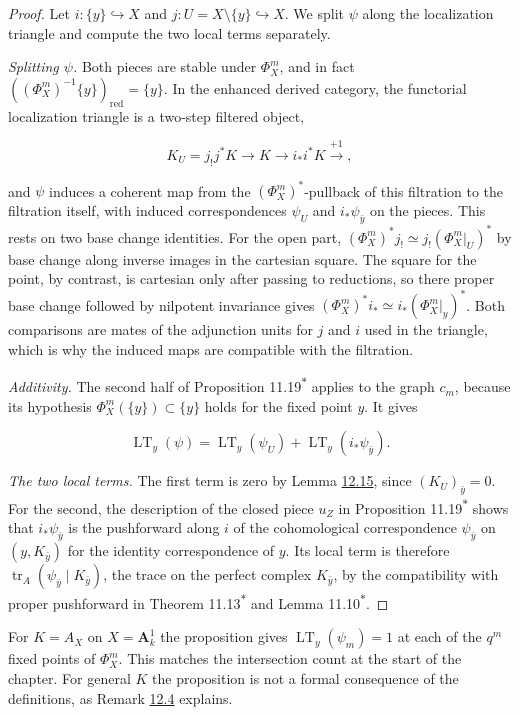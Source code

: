 \documentclass[11pt]{article}
\newcommand{\bpout}[1]{#1\textsuperscript{\hyperlink{bp-outside}{\ensuremath{\ast}}}}
\begin{document}
\begin{proof}[{Proof}]\label{bp50}%
Let \(i:\{y\}\hookrightarrow X\) and \(j:U=X\setminus\{y\}\hookrightarrow X\). We split \(\psi\) along the localization triangle and compute the two local terms separately.

\emph{Splitting \(\psi\).} Both pieces are stable under \(\Phi_X^m\), and in fact \(((\Phi_X^m)^{-1}\{y\})_{\mathrm{red}}=\{y\}\). In the enhanced derived category, the functorial localization triangle is a two-step filtered object,

\[
K_U=j_!j^*K\longrightarrow K\longrightarrow i_*i^*K
\xrightarrow{+1},
\]

and \(\psi\) induces a coherent map from the \((\Phi_X^m)^*\)-pullback of this filtration to the filtration itself, with induced correspondences \(\psi_U\) and \(i_*\psi_{\bar y}\) on the pieces. This rests on two base change identities. For the open part, \((\Phi_X^m)^*j_!\simeq j_!(\Phi_X^m|_U)^*\) by base change along inverse images in the cartesian square. The square for the point, by contrast, is cartesian only after passing to reductions, so there proper base change followed by nilpotent invariance gives \((\Phi_X^m)^*i_*\simeq i_*(\Phi_X^m|_y)^*\). Both comparisons are mates of the adjunction units for \(j\) and \(i\) used in the triangle, which is why the induced maps are compatible with the filtration.

\emph{Additivity.} The second half of Proposition \bpout{11.19} applies to the graph \(c_m\), because its hypothesis \(\Phi_X^m(\{y\})\subset\{y\}\) holds for the fixed point \(y\). It gives

\[
\operatorname{LT}_y(\psi)
=\operatorname{LT}_y(\psi_U)
+\operatorname{LT}_y(i_*\psi_{\bar y}).
\]

\emph{The two local terms.} The first term is zero by Lemma \hyperref[bp45]{12.15}, since \((K_U)_{\bar y}=0\). For the second, the description of the closed piece \(u_Z\) in Proposition \bpout{11.19} shows that \(i_*\psi_{\bar y}\) is the pushforward along \(i\) of the cohomological correspondence \(\psi_{\bar y}\) on \((y,K_{\bar y})\) for the identity correspondence of \(y\). Its local term is therefore \(\operatorname{tr}_A(\psi_{\bar y}\mid K_{\bar y})\), the trace on the perfect complex \(K_{\bar y}\), by the compatibility with proper pushforward in Theorem \bpout{11.13} and Lemma \bpout{11.10}.
\end{proof}

\label{bp51}%
For \(K=A_X\) on \(X=\mathbf A^1_k\) the proposition gives \(\operatorname{LT}_y(\psi_m)=1\) at each of the \(q^m\) fixed points of \(\Phi^m_X\). This matches the intersection count at the start of the chapter. For general \(K\) the proposition is not a formal consequence of the definitions, as Remark \hyperref[bp14]{12.4} explains.
\end{document}
